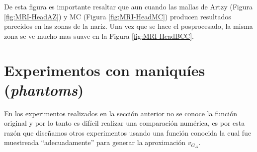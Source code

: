 De esta figura es importante resaltar que aun cuando las mallas de Artzy (Figura \ref{fig:MRI-HeadAZ}) y MC (Figura \ref{fig:MRI-HeadMC}) producen resultados parecidos en las zonas de la nariz. Una vez que se hace el posprocesado, la misma zona se ve mucho mas suave en la Figura \ref{fig:MRI-HeadBCC}.




\section{Experimentos con maniquíes (\emph{phantoms})}
\label{sec:experimentosMaquetas}

En los experimentos realizados en la sección anterior no se conoce la función original y por lo tanto es difícil realizar una comparación numérica, es por esta razón que diseñamos otros experimentos usando una función conocida la cual fue muestreada ``adecuadamente'' para generar la aproximación $v_{G_{\Delta}}$.

